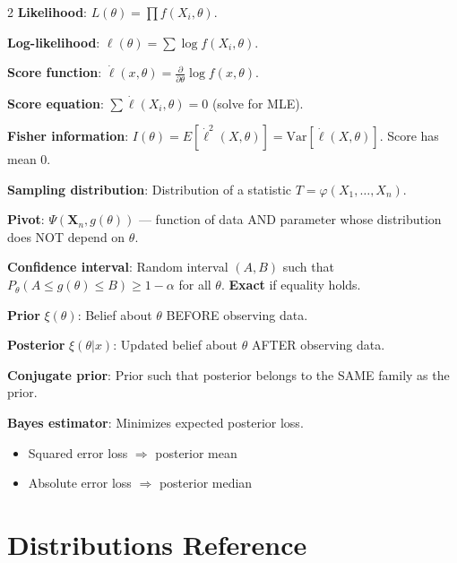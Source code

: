 \documentclass[8pt]{extarticle}
\begin{document}
\begin{multicols}{2}
\textbf{Likelihood}: $L(\theta) = \prod f(X_i, \theta)$.

\textbf{Log-likelihood}: $\ell(\theta) = \sum \log f(X_i,\theta)$.

\textbf{Score function}: $\dot\ell(x,\theta) = \frac{\partial}{\partial\theta}\log f(x,\theta)$.

\textbf{Score equation}: $\sum \dot\ell(X_i,\theta) = 0$ (solve for MLE).

\textbf{Fisher information}: $I(\theta) = E[\dot\ell^2(X,\theta)] = \text{Var}[\dot\ell(X,\theta)]$. Score has mean 0.

\textbf{Sampling distribution}: Distribution of a statistic $T = \varphi(X_1,\ldots,X_n)$.

\textbf{Pivot}: $\Psi(\mathbf{X}_n, g(\theta))$ --- function of data AND parameter whose distribution does NOT depend on $\theta$.

\textbf{Confidence interval}: Random interval $(A,B)$ such that $P_\theta(A \le g(\theta) \le B) \ge 1-\alpha$ for all $\theta$. \textbf{Exact} if equality holds.

\textbf{Prior} $\xi(\theta)$: Belief about $\theta$ BEFORE observing data.

\textbf{Posterior} $\xi(\theta|x)$: Updated belief about $\theta$ AFTER observing data.

\textbf{Conjugate prior}: Prior such that posterior belongs to the SAME family as the prior.

\textbf{Bayes estimator}: Minimizes expected posterior loss.
\begin{itemize}
\item Squared error loss $\Rightarrow$ posterior mean
\item Absolute error loss $\Rightarrow$ posterior median
\end{itemize}

\section{Distributions Reference}


\end{multicols}
\end{document}
